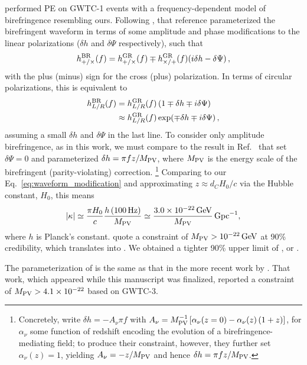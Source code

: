 \documentclass[aps,prd,twocolumn,superscriptaddress,preprintnumbers,nofootinbib]{revtex4-2}
\begin{document}
\citet{Wang_2021} performed \ac{PE} on GWTC-1 events with a frequency-dependent model of birefringence resembling ours.
Following \cite{Zhao:2019xmm}, that reference parameterized the birefringent waveform in terms of some amplitude and phase modifications to the linear polarizations ($\delta h$ and $\delta \Psi$ respectively), such that
\begin{equation}
    h_{+/\times}^{\rm BR}(f) = h_{+/\times}^{\rm GR}(f)\mp h_{\times/+}^{\rm GR}(f)(i\delta h-\delta\Psi)\,,
\end{equation}
with the plus (minus) sign for the cross (plus) polarization.
In terms of circular polarizations, this is equivalent to 
\begin{align}
h^{\rm BR}_{L/R}(f) &= h^{\rm GR}_{L/R}(f) \left(1 \mp \delta h \mp i \delta \Psi \right) \nonumber\\
&\approx h^{\rm GR}_{L/R}(f) \exp(\mp \delta h \mp i \delta \Psi) \, ,
\end{align}
assuming a small $\delta h$ and $\delta \Psi$ in the last line.
To consider only amplitude birefringence, as in this work, we must compare to the result in Ref.~\citep{Wang_2021} that set $\delta \Psi = 0$ and parameterized $\delta h = \pi f z / M_{\rm PV}$, where $M_{\rm PV}$ is the energy scale of the birefringent (parity-violating) correction.%
\footnote{Concretely, \citet{Wang_2021} write $\delta h = - A_\nu \pi f$ with $A_\nu = M_{\rm PV}^{-1} \left[\alpha_\nu (z=0) - \alpha_\nu(z) \left(1+z\right)\right]$, for $\alpha_\nu$ some function of redshift encoding the evolution of a birefringence-mediating field; to produce their constraint, however, they further set $\alpha_\nu(z) = 1$, yielding $A_\nu = -z / M_{\rm PV}$ and hence $\delta h = \pi f z / M_{\rm PV}$.}
Comparing to our Eq.~\eqref{eq:waveform_modification} and approximating $z \approx d_C H_0/c$ via the Hubble constant, $H_0$, this means
\begin{equation}
    |\kappa| \simeq \frac{\pi H_0}{c} \frac{h \left( 100 \, \mathrm{Hz} \right)}{M_{\rm PV}} \simeq \frac{3.0 \times 10^{-22} \, \mathrm{GeV}}{M_\mathrm{PV}} \, \mathrm{Gpc}^{-1},
\end{equation}
where $h$ is Planck's constant.
\citet{Wang_2021} quote a constraint of $M_{\rm PV} > 10^{-22}\, {\rm GeV}$ at 90\% credibility, which translates into .
We obtained a tighter 90\% upper limit of , or .

The parameterization of \citet{Wang_2021} is the same as that in the more recent work by \citet{Zhu:2023wci}.
That work, which appeared while this manuscript was finalized, reported a constraint of $M_{\rm PV} > 4.1 \times 10^{-22}$ based on GWTC-3.
\end{document}
